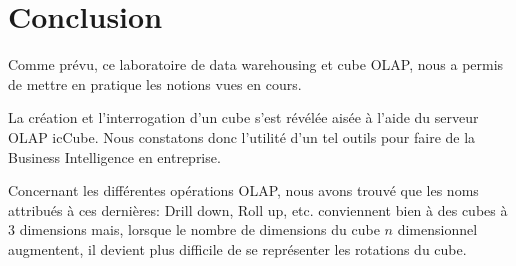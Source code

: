 
\chapter{Conclusion}

Comme prévu, ce laboratoire de data warehousing et cube OLAP, nous a permis de mettre en pratique les notions vues en cours.

La création et l'interrogation d'un cube s'est révélée aisée à l'aide du serveur OLAP icCube. Nous constatons donc l'utilité d'un tel outils pour faire de la Business Intelligence en entreprise.

Concernant les différentes opérations OLAP, nous avons trouvé que les noms attribués à ces dernières: Drill down, Roll up, etc. conviennent bien à des cubes à 3 dimensions mais, lorsque le nombre de dimensions du cube $n$ dimensionnel augmentent, il devient plus difficile de se représenter les rotations du cube.